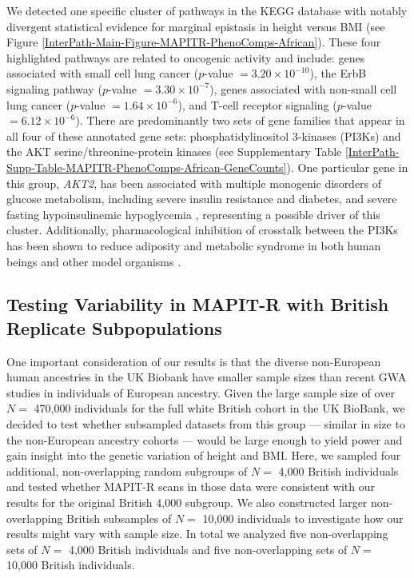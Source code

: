 \documentclass[10pt,a4paper]{article}
\begin{document}
We detected one specific cluster of pathways in the KEGG database with notably divergent statistical evidence for marginal epistasis in height versus BMI (see Figure \ref{InterPath-Main-Figure-MAPITR-PhenoComps-African}). These four highlighted pathways are related to oncogenic activity and include: genes associated with small cell lung cancer ($p$-value $= 3.20\times 10^{-10}$), the ErbB signaling pathway ($p$-value $= 3.30\times 10^{-7}$), genes associated with non-small cell lung cancer ($p$-value $= 1.64\times 10^{-6}$), and T-cell receptor signaling ($p$-value $= 6.12\times 10^{-6}$). There are predominantly two sets of gene families that appear in all four of these annotated gene sets: phosphatidylinositol 3-kinases (PI3Ks) and the AKT serine/threonine-protein kinases (see Supplementary Table \ref{InterPath-Supp-Table-MAPITR-PhenoComps-African-GeneCounts}). One particular gene in this group, \textit{AKT2}, has been associated with multiple monogenic disorders of glucose metabolism, including severe insulin resistance and diabetes, and severe fasting hypoinsulinemic hypoglycemia \cite{George2004,Manning2017,Latva-Rasku2018}, representing a possible driver of this cluster. Additionally, pharmacological inhibition of crosstalk between the PI3Ks has been shown to reduce adiposity and metabolic syndrome in both human beings and other model organisms \cite{Ortega-Molina:2015aa,Grigsby:2017aa,Justice:2017aa,Huang:2018aa,Couto-Alves:2019aa}.

\subsection*{Testing Variability in MAPIT-R with British Replicate Subpopulations}

One important consideration of our results is that the diverse non-European human ancestries in the UK Biobank have smaller sample sizes than recent GWA studies in individuals of European ancestry. Given the large sample size of over $N =$ 470,000 individuals for the full white British cohort in the UK BioBank, we decided to test whether subsampled datasets from this group --- similar in size to the non-European ancestry cohorts --- would be large enough to yield power and gain insight into the genetic variation of height and BMI. Here, we sampled four additional, non-overlapping random subgroups of $N =$ 4,000 British individuals and tested whether MAPIT-R scans in those data were consistent with our results for the original British 4,000 subgroup. We also constructed larger non-overlapping British subsamples of $N =$ 10,000 individuals to investigate how our results might vary with sample size. In total we analyzed five non-overlapping sets of $N =$ 4,000 British individuals and five non-overlapping sets of $N =$ 10,000 British individuals.
\end{document}
